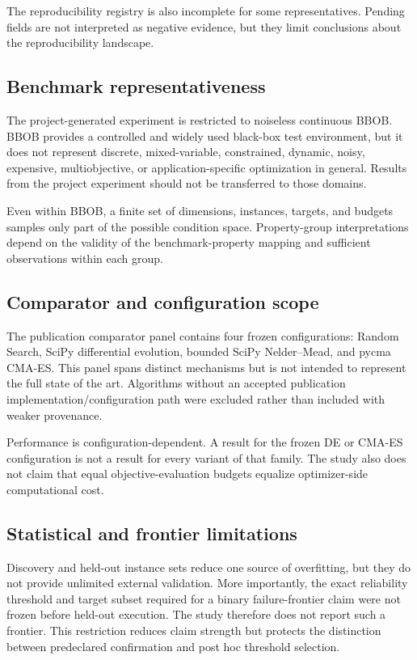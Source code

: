 The reproducibility registry is also incomplete for some representatives. Pending fields are not interpreted as negative evidence, but they limit conclusions about the reproducibility landscape.

\subsection{Benchmark representativeness}

The project-generated experiment is restricted to noiseless continuous BBOB. BBOB provides a controlled and widely used black-box test environment, but it does not represent discrete, mixed-variable, constrained, dynamic, noisy, expensive, multiobjective, or application-specific optimization in general. Results from the project experiment should not be transferred to those domains.

Even within BBOB, a finite set of dimensions, instances, targets, and budgets samples only part of the possible condition space. Property-group interpretations depend on the validity of the benchmark-property mapping and sufficient observations within each group.

\subsection{Comparator and configuration scope}

The publication comparator panel contains four frozen configurations: Random Search, SciPy differential evolution, bounded SciPy Nelder--Mead, and pycma CMA-ES. This panel spans distinct mechanisms but is not intended to represent the full state of the art. Algorithms without an accepted publication implementation/configuration path were excluded rather than included with weaker provenance.

Performance is configuration-dependent. A result for the frozen DE or CMA-ES configuration is not a result for every variant of that family. The study also does not claim that equal objective-evaluation budgets equalize optimizer-side computational cost.

\subsection{Statistical and frontier limitations}

Discovery and held-out instance sets reduce one source of overfitting, but they do not provide unlimited external validation. More importantly, the exact reliability threshold and target subset required for a binary failure-frontier claim were not frozen before held-out execution. The study therefore does not report such a frontier. This restriction reduces claim strength but protects the distinction between predeclared confirmation and post hoc threshold selection.

